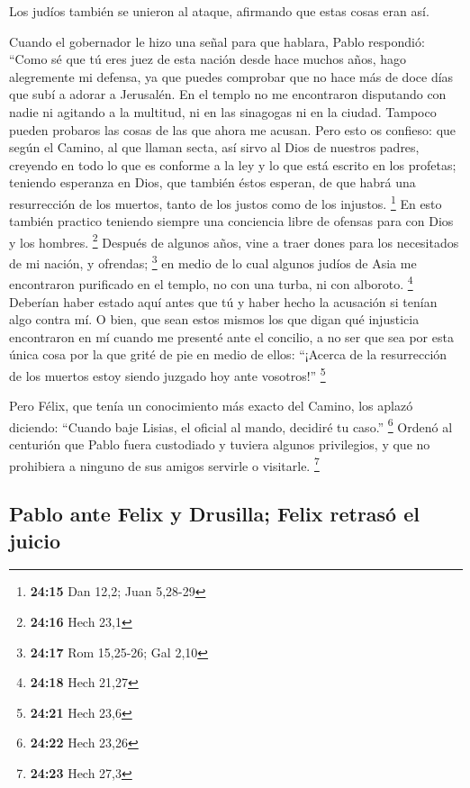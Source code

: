 \begin{paracol}{2}
 Los judíos también se unieron al ataque, afirmando que
estas cosas eran así.

 Cuando el gobernador le hizo una señal para que hablara,
Pablo respondió: ``Como sé que tú eres juez de esta nación desde hace
muchos años, hago alegremente mi defensa,  ya que puedes
comprobar que no hace más de doce días que subí a adorar a Jerusalén.
 En el templo no me encontraron disputando con nadie ni
agitando a la multitud, ni en las sinagogas ni en la ciudad.
 Tampoco pueden probaros las cosas de las que ahora me
acusan.  Pero esto os confieso: que según el Camino, al
que llaman secta, así sirvo al Dios de nuestros padres, creyendo en todo
lo que es conforme a la ley y lo que está escrito en los profetas;
 teniendo esperanza en Dios, que también éstos esperan,
de que habrá una resurrección de los muertos, tanto de los justos como
de los injustos. \footnote{\textbf{24:15} Dan 12,2; Juan 5,28-29}
 En esto también practico teniendo siempre una conciencia
libre de ofensas para con Dios y los hombres. \footnote{\textbf{24:16}
  Hech 23,1}  Después de algunos años, vine a traer dones
para los necesitados de mi nación, y ofrendas; \footnote{\textbf{24:17}
  Rom 15,25-26; Gal 2,10}  en medio de lo cual algunos
judíos de Asia me encontraron purificado en el templo, no con una turba,
ni con alboroto. \footnote{\textbf{24:18} Hech 21,27} 
Deberían haber estado aquí antes que tú y haber hecho la acusación si
tenían algo contra mí.  O bien, que sean estos mismos los
que digan qué injusticia encontraron en mí cuando me presenté ante el
concilio,  a no ser que sea por esta única cosa por la
que grité de pie en medio de ellos: ``¡Acerca de la resurrección de los
muertos estoy siendo juzgado hoy ante vosotros!'' \footnote{\textbf{24:21}
  Hech 23,6}

 Pero Félix, que tenía un conocimiento más exacto del
Camino, los aplazó diciendo: ``Cuando baje Lisias, el oficial al mando,
decidiré tu caso.'' \footnote{\textbf{24:22} Hech 23,26} 
Ordenó al centurión que Pablo fuera custodiado y tuviera algunos
privilegios, y que no prohibiera a ninguno de sus amigos servirle o
visitarle. \footnote{\textbf{24:23} Hech 27,3}

\hypertarget{pablo-ante-felix-y-drusilla-felix-retrasuxf3-el-juicio}{%
\subsection{Pablo ante Felix y Drusilla; Felix retrasó el
juicio}\label{pablo-ante-felix-y-drusilla-felix-retrasuxf3-el-juicio}}


\end{paracol}
